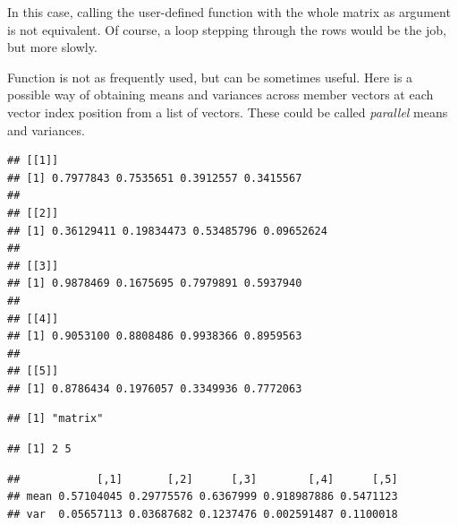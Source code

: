 \documentclass[krantz2]{krantz}\usepackage{knitr}%
\begin{document}
\begin{warningbox}
In this case, calling the user-defined function with the whole matrix as argument is not equivalent. Of course, a  loop stepping through the rows would be the job, but more slowly.

\end{warningbox}

Function  is not as frequently used, but can be sometimes useful. Here is a possible way of obtaining means and variances across member vectors at each vector index position from a list of vectors. These could be called \emph{parallel} means and variances.

\begin{knitrout}\footnotesize
{}\color{fgcolor}\begin{kframe}
\begin{alltt}
\hlstd{(}\hlstd{)}
 \hlkwb{<-} \hlstd{(}\hlstd{(}\hlstd{,} 
\end{alltt}
\begin{verbatim}
## [[1]]
## [1] 0.7977843 0.7535651 0.3912557 0.3415567
## 
## [[2]]
## [1] 0.36129411 0.19834473 0.53485796 0.09652624
## 
## [[3]]
## [1] 0.9878469 0.1675695 0.7979891 0.5937940
## 
## [[4]]
## [1] 0.9053100 0.8808486 0.9938366 0.8959563
## 
## [[5]]
## [1] 0.8786434 0.1976057 0.3349936 0.7772063
\end{verbatim}
\begin{alltt}
 \hlkwb{<-} \hlstd{(}\hlstd{,}  \hlstd{=} \hlstd{) \{}
       \hlstd{(}      
    \hlstd{\}}
 \hlkwb{<-} \hlstd{(} 
                  
                  \hlstd{=} \hlstd{(} \hlstd{=} \hlstd{,}  \hlstd{=} \hlstd{),}
                  \hlstd{=} \hlstd{)}
\end{alltt}
\begin{verbatim}
## [1] "matrix"
\end{verbatim}
\begin{alltt}
\end{alltt}
\begin{verbatim}
## [1] 2 5
\end{verbatim}
\begin{alltt}
\end{alltt}
\begin{verbatim}
##            [,1]       [,2]      [,3]        [,4]      [,5]
## mean 0.57104045 0.29775576 0.6367999 0.918987886 0.5471123
## var  0.05657113 0.03687682 0.1237476 0.002591487 0.1100018
\end{verbatim}
\end{kframe}
\end{knitrout}
\end{document}
